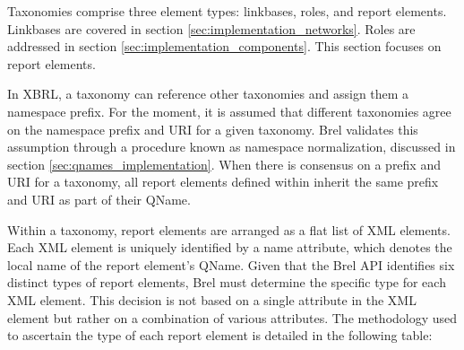 Taxonomies comprise three element types: linkbases, roles, and report elements.
Linkbases are covered in section \ref{sec:implementation_networks}.
Roles are addressed in section \ref{sec:implementation_components}.
This section focuses on report elements.

In XBRL, a taxonomy can reference other taxonomies and assign them a namespace prefix.
For the moment, it is assumed that different taxonomies agree on the namespace prefix and URI for a given taxonomy.
Brel validates this assumption through a procedure known as namespace normalization, discussed in section \ref{sec:qnames_implementation}.
When there is consensus on a prefix and URI for a taxonomy, all report elements defined within inherit the same prefix and URI as part of their QName.

Within a taxonomy, report elements are arranged as a flat list of XML elements.
Each XML element is uniquely identified by a name attribute, which denotes the local name of the report element's QName.
Given that the Brel API identifies six distinct types of report elements, Brel must determine the specific type for each XML element.
This decision is not based on a single attribute in the XML element but rather on a combination of various attributes.
The methodology used to ascertain the type of each report element is detailed in the following table:

\begin{table}[H]
    \centering
    \caption{Determining the type of report element}
    \label{tab:determining_report_element_type}
\end{table}


